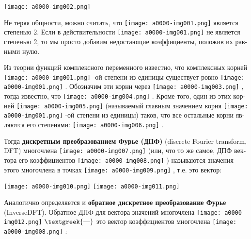 \documentclass[a4paper]{article}
\begin{document}
 \texttt{[image: a0000-img002.png]} 

\foreignlanguage{russian}{Не теряя общности, можно считать, что }
\texttt{[image: a0000-img001.png]} \foreignlanguage{russian}{является степенью 2. Если в
действительности } \texttt{[image: a0000-img001.png]} \foreignlanguage{russian}{не
является степенью 2, то мы просто добавим недостающие коэффициенты, положив их равными нулю.}

\foreignlanguage{russian}{Из теории функций комплексного переменного известно, что комплексных корней }
\texttt{[image: a0000-img001.png]} \foreignlanguage{russian}{{}-ой степени из единицы
существует ровно } \texttt{[image: a0000-img001.png]} \foreignlanguage{russian}{.
Обозначим эти корни через } \texttt{[image: a0000-img003.png]}
\foreignlanguage{russian}{, тогда известно, что } \texttt{[image: a0000-img004.png]}
\foreignlanguage{russian}{. Кроме того, один из этих корней }
\texttt{[image: a0000-img005.png]} \foreignlanguage{russian}{(называемый главным
значением корня } \texttt{[image: a0000-img001.png]} \foreignlanguage{russian}{{}-ой
степени из единицы) таков, что все остальные корни являются его степенями: }
\texttt{[image: a0000-img006.png]} \foreignlanguage{russian}{.}

\foreignlanguage{russian}{Тогда }\foreignlanguage{russian}{\textbf{дискретным преобразованием Фурье
(ДПФ)}}\foreignlanguage{russian}{ (}discrete\foreignlanguage{russian}{ }Fourier\foreignlanguage{russian}{
}transform\foreignlanguage{russian}{, }DFT\foreignlanguage{russian}{) многочлена }
\texttt{[image: a0000-img007.png]} \foreignlanguage{russian}{(или, что то же самое, ДПФ
вектора его коэффициентов } \texttt{[image: a0000-img008.png]}
\foreignlanguage{russian}{) называются значения этого многочлена в точках }
\texttt{[image: a0000-img009.png]} \foreignlanguage{russian}{, т.е. это вектор:}

 \texttt{[image: a0000-img010.png]} 
\texttt{[image: a0000-img011.png]} 

\foreignlanguage{russian}{Аналогично определяется и }\foreignlanguage{russian}{\textbf{обратное дискретное
преобразование Фурье}}\foreignlanguage{russian}{ (}InverseDFT\foreignlanguage{russian}{). Обратное ДПФ для вектора
значений многочлена } \texttt{[image: a0000-img012.png]}
\foreignlanguage{russian}{$\text{\textgreek{—}}$ это вектор коэффициентов многочлена }
\texttt{[image: a0000-img008.png]} \foreignlanguage{russian}{:}
\end{document}
